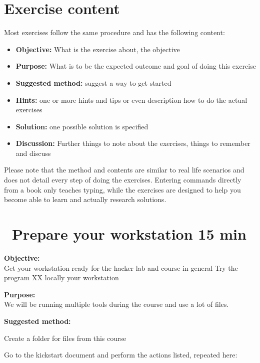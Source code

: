 \documentclass[a4paper,11pt,notitlepage]{report}
\begin{document}

\chapter*{\color{titlecolor}Exercise content}

Most exercises follow the same procedure and has the following content:
\begin{itemize}
\item {\bf Objective:} What is the exercise about, the objective
\item {\bf Purpose:} What is to be the expected outcome and goal of doing this exercise
\item {\bf Suggested method:} suggest a way to get started
\item {\bf Hints:} one or more hints and tips or even description how to
do the actual exercises
\item {\bf Solution:} one possible solution is specified
\item {\bf Discussion:} Further things to note about the exercises, things to remember and discuss
\end{itemize}

Please note that the method and contents are similar to real life scenarios and does not detail every step of doing the exercises. Entering commands directly from a book only teaches typing, while the exercises are designed to help you become able to learn and actually research solutions.


\chapter{\faExclamationTriangle\ Prepare your workstation 15 min}
\label{ex:prepare-for-course}

{\bf Objective:}\\
Get your workstation ready for the hacker lab and course in general
Try the program XX locally your workstation


{\bf Purpose:}\\
We will be running multiple tools during the course and use a lot of files.


{\bf Suggested method:}\\
\begin{list2}
\item Create a folder for files from this course
\item Go to the kickstart document and perform the actions listed, repeated here:
\end{list2}
\end{document}
